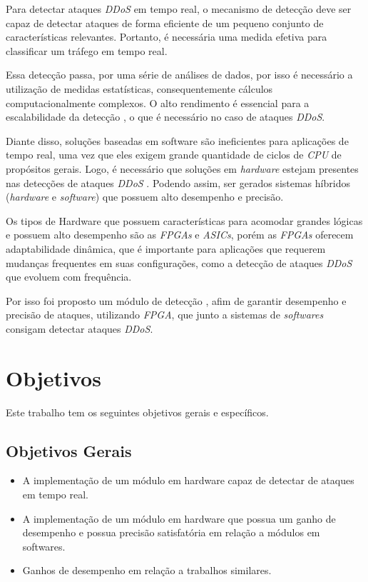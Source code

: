 Para detectar ataques  \textit{DDoS} em tempo real, o mecanismo de detecção deve ser capaz de detectar ataques de forma eficiente de um pequeno conjunto de características relevantes.
Portanto, é necessária uma medida efetiva  para classificar um  tráfego em tempo real. 

Essa detecção passa, por uma série de análises de dados, por isso é necessário a utilização de medidas estatísticas, consequentemente cálculos computacionalmente complexos. O alto rendimento é essencial para a escalabilidade da detecção , o que é necessário no caso de ataques \textit{DDoS}.

Diante disso, soluções baseadas em software são ineficientes para aplicações de tempo real, uma vez que eles exigem grande quantidade de ciclos de \textit{CPU} de propósitos gerais. Logo, é necessário que soluções em \textit{hardware} estejam presentes nas detecções de ataques \textit{DDoS} . Podendo assim, ser gerados sistemas híbridos (\textit{hardware} e \textit{software}) que possuem alto desempenho e precisão.

Os tipos de Hardware que possuem características para acomodar grandes lógicas e possuem alto desempenho são as \textit{FPGAs} e \textit{ASICs}, porém as \textit{FPGAs} oferecem adaptabilidade dinâmica, que é importante para aplicações que requerem mudanças frequentes em suas configurações, como a detecção de ataques \textit{DDoS} que evoluem com frequência. 

Por isso foi proposto um módulo de detecção , afim de garantir desempenho e precisão de ataques, utilizando \textit{FPGA}, que junto a sistemas de  \textit{softwares} consigam detectar ataques  \textit{DDoS}.

\section{Objetivos}

   Este trabalho tem os seguintes objetivos gerais e específicos.
\subsection{Objetivos Gerais}
\begin{itemize}

\item  A implementação de um módulo em hardware capaz de detectar de ataques em tempo real.

\item  A implementação de um módulo em hardware que possua um ganho de desempenho e possua precisão satisfatória em relação a módulos em softwares.

\item Ganhos de desempenho em relação a trabalhos similares.	

\end{itemize}

